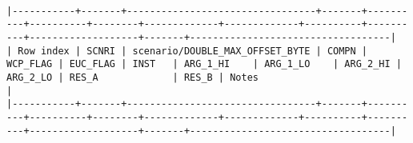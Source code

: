 \documentclass[varwidth=\maxdimen,margin=0.5cm,multi={verbatim}]{standalone}
\begin{document}
\begin{verbatim}

|-----------+-------+---------------------------------+-------+----------+----------+--------+-------------+-------------+----------+----------+-------------------+-------+-----------------------------------|
| Row index | SCNRI | scenario/DOUBLE_MAX_OFFSET_BYTE | COMPN | WCP_FLAG | EUC_FLAG | INST   | ARG_1_HI    | ARG_1_LO    | ARG_2_HI | ARG_2_LO | RES_A             | RES_B | Notes                             |
|-----------+-------+---------------------------------+-------+----------+----------+--------+-------------+-------------+----------+----------+-------------------+-------+-----------------------------------|

\end{verbatim}
\end{document}
